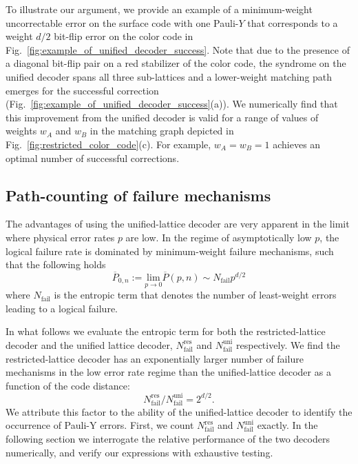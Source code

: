 \documentclass[a4paper,twocolumn,11pt,accepted=2024-12-23]{quantumarticle}
\begin{document}
To illustrate our argument, we provide an example of a minimum-weight uncorrectable error on the surface code with one Pauli-$Y$ that corresponds to a weight $d/2$ bit-flip error on the color code in Fig.~\ref{fig:example_of_unified_decoder_success}. Note that due to the presence of a diagonal bit-flip pair on a red stabilizer of the color code, the syndrome on the unified decoder spans all three sub-lattices and a lower-weight matching path emerges for the successful correction (Fig.~\ref{fig:example_of_unified_decoder_success}(a)). 
We numerically find that this improvement from the unified decoder is valid for a range of values of weights $w_A$ and $w_B$ in the matching graph depicted in Fig.~\ref{fig:restricted_color_code}(c). For example, $w_A = w_B = 1$ achieves an optimal number of successful corrections. 


\subsection{\label{ssec:path_counting_toric} Path-counting of failure mechanisms}


The advantages of using the unified-lattice decoder are very apparent in the limit where physical error rates $p$ are low. In the regime of asymptotically low $p$, the logical failure rate is dominated by minimum-weight failure mechanisms, such that the following holds
\begin{equation}
    \overline{P}_{0,n} := \underset{p \rightarrow 0}{\text{lim}}\overline{P}(p,n) \sim N_{\textrm{fail}} p^{d/2}
\end{equation}
where $N_\textrm{fail}$ is the entropic term that denotes the number of least-weight errors leading to a logical failure.

In what follows we evaluate the entropic term for both the restricted-lattice decoder and the unified lattice decoder, $N^{\textrm{res}}_{\textrm{fail}}  $ and $ N^{\textrm{uni}}_{\textrm{fail}} $ respectively. We find the restricted-lattice decoder has an exponentially larger number of failure mechanisms in the low error rate regime than the unified-lattice decoder as a function of the code distance:
\begin{equation}
 N^{\textrm{res}}_{\textrm{fail}} / N^{\textrm{uni}}_{\textrm{fail}} = 2^{d/2}. \label{eqn:ratio}
\end{equation}
 We attribute this factor to the ability of the unified-lattice decoder to identify the occurrence of Pauli-Y errors. First, we count $N^{\textrm{res}}_{\textrm{fail}}  $ and $ N^{\textrm{uni}}_{\textrm{fail}} $ exactly. In the following section we interrogate the relative performance of the two decoders numerically, and verify our expressions with exhaustive testing. 
\end{document}

